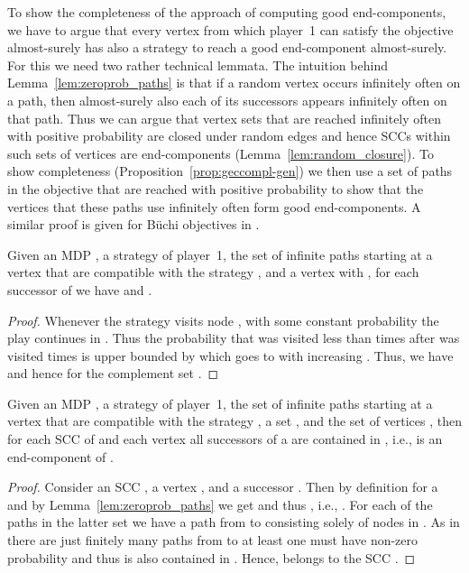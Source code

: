 \documentclass[11pt,letterpaper]{article}
\begin{document}
To show the completeness of the approach of computing good end-components,
we have to argue that every vertex from which player~1 can satisfy the objective 
almost-surely has also a strategy to reach a good end-component almost-surely.
For this we need two rather technical lemmata.
The intuition behind Lemma~\ref{lem:zeroprob_paths} is that if a random vertex 
occurs infinitely often on a path,
then almost-surely also each of its successors appears infinitely often on that 
path. Thus we can argue that vertex sets that are reached infinitely often 
with positive probability are closed under random edges and hence SCCs within such 
sets of vertices are end-components (Lemma~\ref{lem:random_closure}). 
To show completeness (Proposition~\ref{prop:geccompl-gen})
we then use a set of paths in the objective that are reached with positive 
probability to show that the vertices that these paths use infinitely often 
form good end-components. A similar proof is given for Büchi objectives in
\cite{CourcoubetisY95}. 

\begin{lemma}\label{lem:zeroprob_paths}
  Given an MDP , a strategy  of player~1,
  the set  of infinite paths starting at a vertex  that are compatible with the strategy , and
  a vertex  with ,
  for each successor  of  we have  
    and
  .
\end{lemma}
\begin{proof}
  Whenever the strategy visits node , with some constant probability  the play continues in .
  Thus the probability that  was visited less than  times after  was visited  times
  is upper bounded by  which goes to  with increasing .
  Thus, we have 
  and hence for the complement set .
\end{proof}

\begin{lemma}\label{lem:random_closure} 
  Given an MDP , a strategy  of player~1,
  the set  of infinite paths starting at a vertex  that are compatible with the strategy , 
  a set , and the set of vertices 
  , then
  for each SCC  of  and each vertex  all successors of a are contained in , i.e.,  is an end-component of .
\end{lemma}
\begin{proof}
 Consider an SCC , a vertex , and a successor .
 Then by definition  
 for a  and by Lemma~\ref{lem:zeroprob_paths} 
 we get  
 and thus  ,
 i.e., .
 For each of the paths  in the latter set we have a path from  to  consisting solely of nodes in .
 As in  there are just finitely many paths from  to  at least one must have non-zero probability 
 and thus is also contained in .  Hence,  belongs to the SCC .
\end{proof}
\end{document}
